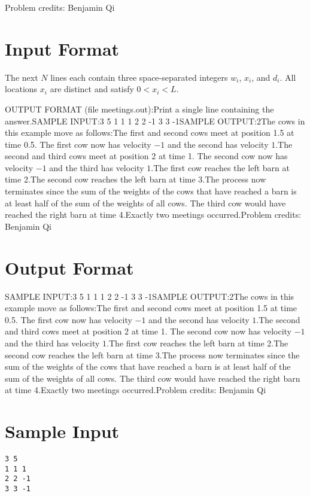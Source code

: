 \documentclass[12pt]{article}
\begin{document}
Problem credits: Benjamin Qi



\section*{Input Format}
The next $N$ lines each contain three space-separated integers $w_i$, $x_i$, and
$d_i.$ All locations $x_i$ are distinct and satisfy $0<x_i<L.$

OUTPUT FORMAT (file meetings.out):Print a single line containing the answer.SAMPLE INPUT:3 5
1 1 1
2 2 -1
3 3 -1SAMPLE OUTPUT:2The cows in this example move as follows:The first and second cows meet at position 1.5 at time 0.5. The first cow now
has velocity $-1$ and the second has velocity $1.$The second and third cows meet at position 2 at time 1. The second cow now
has velocity $-1$ and the third has velocity $1.$The first cow reaches the left barn at time 2.The second cow reaches the left barn at time 3.The process now terminates since the sum of the weights of the cows that 
have reached a barn is at least half of the sum of the weights of all cows.  The
third cow would have reached the right barn at time 4.Exactly two meetings occurred.Problem credits: Benjamin Qi

\section*{Output Format}
SAMPLE INPUT:3 5
1 1 1
2 2 -1
3 3 -1SAMPLE OUTPUT:2The cows in this example move as follows:The first and second cows meet at position 1.5 at time 0.5. The first cow now
has velocity $-1$ and the second has velocity $1.$The second and third cows meet at position 2 at time 1. The second cow now
has velocity $-1$ and the third has velocity $1.$The first cow reaches the left barn at time 2.The second cow reaches the left barn at time 3.The process now terminates since the sum of the weights of the cows that 
have reached a barn is at least half of the sum of the weights of all cows.  The
third cow would have reached the right barn at time 4.Exactly two meetings occurred.Problem credits: Benjamin Qi

\section*{Sample Input}
\begin{verbatim}
3 5
1 1 1
2 2 -1
3 3 -1
\end{verbatim}
\end{document}
